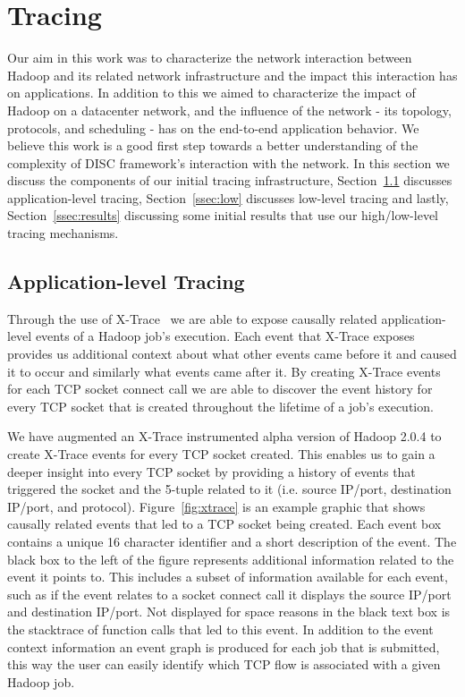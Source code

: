 \section{Tracing}
\label{sec:tracing}
Our aim in this work was to characterize the network interaction 
between Hadoop and its related network infrastructure and the impact this 
interaction has on applications. In addition to this we aimed to 
characterize the impact of Hadoop on a datacenter network, and the 
influence of the network - its topology, protocols, and scheduling - has on the 
end-to-end application behavior. We believe this work is a good first step 
towards a better understanding of the complexity of DISC framework's interaction
with the network. In this section we discuss the components of our initial tracing
infrastructure, Section~\ref{ssec:app} discusses application-level tracing, 
Section~\ref{ssec:low} discusses low-level tracing and lastly, 
Section~\ref{ssec:results} discussing some initial results that use our high/low-level
tracing mechanisms.

\subsection{Application-level Tracing}
\label{ssec:app}
Through the use of X-Trace~\cite{xtrace} we are able to expose causally related 
application-level events of a Hadoop job's execution. Each event that X-Trace
exposes provides us additional context about what other events came before it and
caused it to occur and similarly what events came after it. By creating X-Trace 
events for each TCP socket connect call we are able to discover the event history
for every TCP socket that is created throughout the lifetime of a job's execution.

We have augmented an X-Trace instrumented alpha version of Hadoop 2.0.4 to create 
X-Trace events for every TCP socket created. This enables us to gain a deeper insight
into every TCP socket by providing a history of events that triggered the socket and
the 5-tuple related to it (i.e. source IP/port, destination IP/port, and protocol).
Figure~\ref{fig:xtrace} is an example graphic that shows causally related events that
led to a TCP socket being created. Each event box contains a unique 16 character 
identifier and a short description of the event. The black box to the left of the 
figure represents additional information related to the event it points to. This includes 
a subset of information available for each event, such as if the event relates to a socket
connect call it displays the source IP/port and destination IP/port. Not displayed for space
reasons in the black text box is the stacktrace of function calls that led to this event. In 
addition to the event context information an event graph is produced for each job that is 
submitted, this way the user can easily identify which TCP flow is associated with a given 
Hadoop job.

